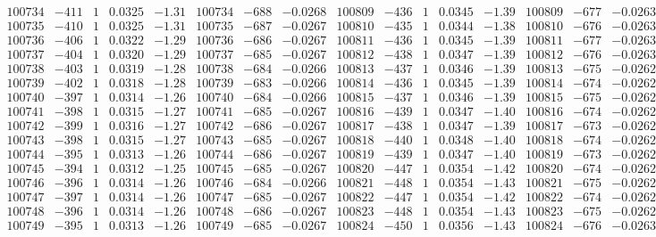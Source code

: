\documentclass[11pt,reqno,a4letter]{article}
\numberwithin{figure}{section}
\numberwithin{table}{section}
\theoremstyle{plain}
\numberwithin{theorem}{section}
\theoremstyle{definition}
\begin{document}
\begin{table}[ht!]
\begin{equation*}
{\begin{array}{ccccc|ccc||ccccc|ccc}
100734 & -411 & 1 & 0.0325 & -1.31 & 100734 & -688 & -0.0268 & 100809 & -436 & 1 & 0.0345 & -1.39 & 100809 & -677 & -0.0263  \\
100735 & -410 & 1 & 0.0325 & -1.31 & 100735 & -687 & -0.0267 & 100810 & -435 & 1 & 0.0344 & -1.38 & 100810 & -676 & -0.0263  \\
100736 & -406 & 1 & 0.0322 & -1.29 & 100736 & -686 & -0.0267 & 100811 & -436 & 1 & 0.0345 & -1.39 & 100811 & -677 & -0.0263  \\
100737 & -404 & 1 & 0.0320 & -1.29 & 100737 & -685 & -0.0267 & 100812 & -438 & 1 & 0.0347 & -1.39 & 100812 & -676 & -0.0263  \\
100738 & -403 & 1 & 0.0319 & -1.28 & 100738 & -684 & -0.0266 & 100813 & -437 & 1 & 0.0346 & -1.39 & 100813 & -675 & -0.0262  \\
100739 & -402 & 1 & 0.0318 & -1.28 & 100739 & -683 & -0.0266 & 100814 & -436 & 1 & 0.0345 & -1.39 & 100814 & -674 & -0.0262  \\
100740 & -397 & 1 & 0.0314 & -1.26 & 100740 & -684 & -0.0266 & 100815 & -437 & 1 & 0.0346 & -1.39 & 100815 & -675 & -0.0262  \\
100741 & -398 & 1 & 0.0315 & -1.27 & 100741 & -685 & -0.0267 & 100816 & -439 & 1 & 0.0347 & -1.40 & 100816 & -674 & -0.0262  \\
100742 & -399 & 1 & 0.0316 & -1.27 & 100742 & -686 & -0.0267 & 100817 & -438 & 1 & 0.0347 & -1.39 & 100817 & -673 & -0.0262  \\
100743 & -398 & 1 & 0.0315 & -1.27 & 100743 & -685 & -0.0267 & 100818 & -440 & 1 & 0.0348 & -1.40 & 100818 & -674 & -0.0262  \\
100744 & -395 & 1 & 0.0313 & -1.26 & 100744 & -686 & -0.0267 & 100819 & -439 & 1 & 0.0347 & -1.40 & 100819 & -673 & -0.0262  \\
100745 & -394 & 1 & 0.0312 & -1.25 & 100745 & -685 & -0.0267 & 100820 & -447 & 1 & 0.0354 & -1.42 & 100820 & -674 & -0.0262  \\
100746 & -396 & 1 & 0.0314 & -1.26 & 100746 & -684 & -0.0266 & 100821 & -448 & 1 & 0.0354 & -1.43 & 100821 & -675 & -0.0262  \\
100747 & -397 & 1 & 0.0314 & -1.26 & 100747 & -685 & -0.0267 & 100822 & -447 & 1 & 0.0354 & -1.42 & 100822 & -674 & -0.0262  \\
100748 & -396 & 1 & 0.0314 & -1.26 & 100748 & -686 & -0.0267 & 100823 & -448 & 1 & 0.0354 & -1.43 & 100823 & -675 & -0.0262  \\
100749 & -395 & 1 & 0.0313 & -1.26 & 100749 & -685 & -0.0267 & 100824 & -450 & 1 & 0.0356 & -1.43 & 100824 & -676 & -0.0263  \\

\end{array}}
\end{equation*}
\end{table}
\end{document}
